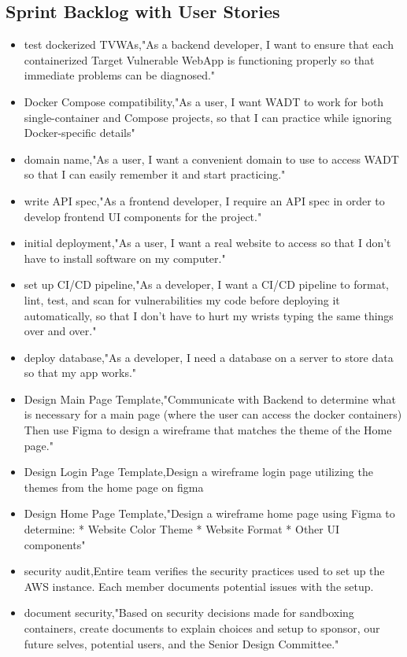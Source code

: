 \documentclass[12pt,titlepage]{article}
\begin{document}
\subsection{Sprint Backlog with User Stories}
\begin{itemize}
\item test dockerized TVWAs,"As a backend developer, I want to ensure that each containerized Target Vulnerable WebApp is functioning properly so that immediate problems can be diagnosed."
\item Docker Compose compatibility,"As a user, I want WADT to work for both single-container and Compose projects, so that I can practice while ignoring Docker-specific details"
\item domain name,"As a user, I want a convenient domain to use to access WADT so that I can easily remember it and start practicing."
\item write API spec,"As a frontend developer, I require an API spec in order to develop frontend UI components for the project."
\item initial deployment,"As a user, I want a real website to access so that I don’t have to install software on my computer."
\item set up CI/CD pipeline,"As a developer, I want a CI/CD pipeline to format, lint, test, and scan for vulnerabilities my code before deploying it automatically, so that I don’t have to hurt my wrists typing the same things over and over."
\item deploy database,"As a developer, I need a database on a server to store data so that my app works."
\item Design Main Page Template,"Communicate with Backend to determine what is necessary for a main page (where the user can access the docker containers) Then use Figma to design a wireframe that matches the theme of the Home page."
\item Design Login Page Template,Design a wireframe login page utilizing the themes from the home page on figma
\item Design Home Page Template,"Design a wireframe home page using Figma to determine: * Website Color Theme * Website Format * Other UI components"
\item security audit,Entire team verifies the security practices used to set up the AWS instance. Each member documents potential issues with the setup.
\item document security,"Based on security decisions made for sandboxing containers, create documents to explain choices and setup to sponsor, our future selves, potential users, and the Senior Design Committee."
\end{itemize}
\end{document}
